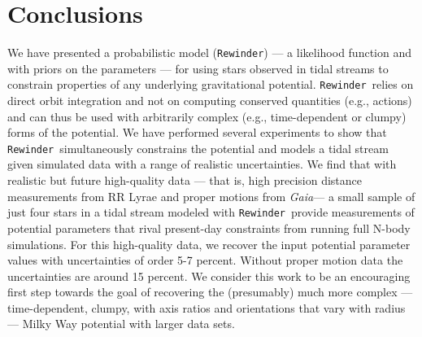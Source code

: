 \documentclass[letterpaper,12pt,preprint]{aastex}
\newcommand{\project}[1]{\textsl{#1}}
\newcommand{\gaia}{\project{Gaia}}
\newcommand{\rewinder}{\texttt{Rewinder}}
\begin{document}


\section{Conclusions}\label{sec:conclusion}
We have presented a probabilistic model (\rewinder) --- a likelihood function and with priors on the parameters --- for using stars observed in tidal streams to constrain properties of any underlying gravitational potential. \rewinder\ relies on direct orbit integration and not on computing conserved quantities (e.g., actions) and can thus be used with arbitrarily complex (e.g., time-dependent or clumpy) forms of the potential. We have performed several experiments to show that \rewinder\ simultaneously constrains the potential and models a tidal stream given simulated data with a range of realistic uncertainties. We find that with realistic but future high-quality data --- that is, high precision distance measurements from RR Lyrae and proper motions from \gaia --- a small sample of just four stars in a tidal stream modeled with \rewinder\, provide measurements of potential parameters that rival present-day constraints from running full N-body simulations. For this high-quality data, we recover the input potential parameter values with uncertainties of order 5-7 percent. Without proper motion data the uncertainties are around 15 percent. We consider this work to be an encouraging first step towards the goal of recovering the (presumably) much more complex --- time-dependent, clumpy, with axis ratios and orientations that vary with radius --- Milky Way potential with larger data sets.
\end{document}
